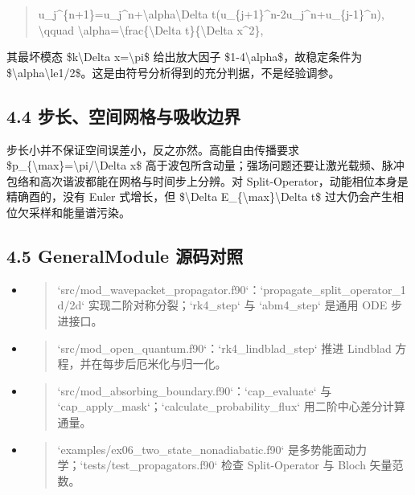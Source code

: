 \documentclass[UTF8,openany,11pt,fontset=fandol]{ctexbook}
\begin{document}
\begin{quote}
u\_j\^{}\{n+1\}=u\_j\^{}n+\textbackslash alpha\textbackslash Delta
t(u\_\{j+1\}\^{}n-2u\_j\^{}n+u\_\{j-1\}\^{}n), \textbackslash qquad
\textbackslash alpha=\textbackslash frac\{\textbackslash Delta
t\}\{\textbackslash Delta x\^{}2\},
\end{quote}

其最坏模态 \$k\textbackslash Delta x=\textbackslash pi\$ 给出放大因子
\$1-4\textbackslash alpha\$，故稳定条件为
\$\textbackslash alpha\textbackslash le1/2\$。这是由符号分析得到的充分判据，不是经验调参。

\subsection{\texorpdfstring{\textbf{4.4
步长、空间网格与吸收边界}}{4.4 步长、空间网格与吸收边界}}\label{ux6b65ux957fux7a7aux95f4ux7f51ux683cux4e0eux5438ux6536ux8fb9ux754c}

步长小并不保证空间误差小，反之亦然。高能自由传播要求
\$p\_\{\textbackslash max\}=\textbackslash pi/\textbackslash Delta x\$
高于波包所含动量；强场问题还要让激光载频、脉冲包络和高次谐波都能在网格与时间步上分辨。对
Split-Operator，动能相位本身是精确酉的，没有 Euler 式增长，但
\$\textbackslash Delta E\_\{\textbackslash max\}\textbackslash Delta t\$
过大仍会产生相位欠采样和能量谱污染。

\subsection{\texorpdfstring{\textbf{4.5 GeneralModule
源码对照}}{4.5 GeneralModule 源码对照}}\label{generalmodule-ux6e90ux7801ux5bf9ux7167-3}

\begin{itemize}
\item
  \begin{quote}
  `src/mod\_wavepacket\_propagator.f90`：`propagate\_split\_operator\_1d/2d`
  实现二阶对称分裂；`rk4\_step` 与 `abm4\_step` 是通用 ODE 步进接口。
  \end{quote}
\item
  \begin{quote}
  `src/mod\_open\_quantum.f90`：`rk4\_lindblad\_step` 推进 Lindblad
  方程，并在每步后厄米化与归一化。
  \end{quote}
\item
  \begin{quote}
  `src/mod\_absorbing\_boundary.f90`：`cap\_evaluate` 与
  `cap\_apply\_mask`；`calculate\_probability\_flux`
  用二阶中心差分计算通量。
  \end{quote}
\item
  \begin{quote}
  `examples/ex06\_two\_state\_nonadiabatic.f90`
  是多势能面动力学；`tests/test\_propagators.f90` 检查 Split-Operator 与
  Bloch 矢量范数。
  \end{quote}
\end{itemize}
\end{document}
